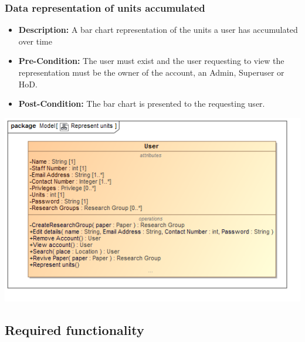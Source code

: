 \documentclass[11pt]{article}
\begin{document}
		\subsubsection{Data representation of units accumulated}
		\begin{itemize}
			\item \textbf{Description: }A bar chart representation of the units a user has accumulated over time
			\item \textbf{Pre-Condition: }The user must exist and the user requesting to view the representation must be the owner of the account, an Admin, Superuser or HoD.
			\item \textbf{Post-Condition: }The bar chart is presented to the requesting user.
		\end{itemize}
		\begin{center}
			\includegraphics[width=\textwidth]{../Diagrams/DomainModel/Representunits.png}\\[0.5cm]
		\end{center}
	
	\subsection{Required functionality}
	
	
\end{document}
